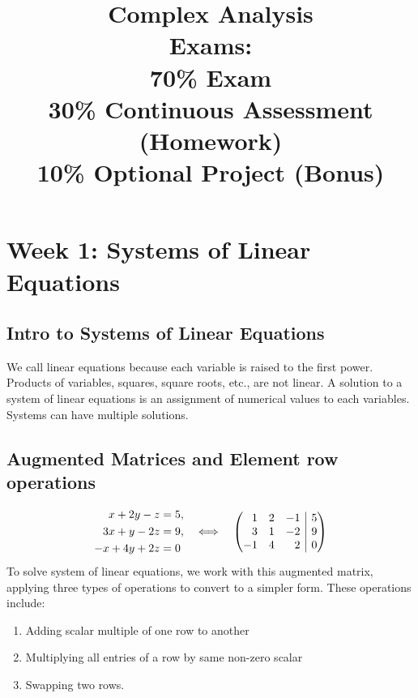 \documentclass[12pt]{article}
\title{
Complex Analysis\\[2ex]
Exams:\\
70\% Exam\\
30\% Continuous Assessment (Homework) \\
10\% Optional Project (Bonus)\\
}
\author{}     %
\date{}       %
\theoremstyle{definition}
\theoremstyle{plain}
\begin{document}
\maketitle
\pagebreak

\tableofcontents
\pagebreak
\section{Week 1: Systems of Linear Equations}
\subsection{Intro to Systems of Linear Equations}
We call linear equations because each variable is raised to the first power. Products of variables, squares, square roots, etc., are not linear. 
A solution to a system of linear equations is an assignment of numerical values to each variables. Systems can have multiple solutions. 

\subsection{Augmented Matrices and Element row operations} 
\[
\begin{aligned}
x + 2y - z &= 5,\\
3x + y - 2z &= 9,\\
-x + 4y + 2z &= 0
\end{aligned}
\quad
\Longleftrightarrow
\quad 
\left(\begin{array}{@{} r r r | r @{}}
    1 & 2 & -1 & 5 \\
    3 & 1 & -2 & 9 \\
    -1 & 4 & 2 & 0
  \end{array}\right)
\]
To solve system of linear equations, we work with this augmented matrix, 
applying three types of operations to convert to a simpler form. These operations include:
\begin{enumerate}
    \item Adding scalar multiple of one row to another
    \item Multiplying all entries of a row by same non-zero scalar
    \item Swapping two rows. 
\end{enumerate}
\end{document}
